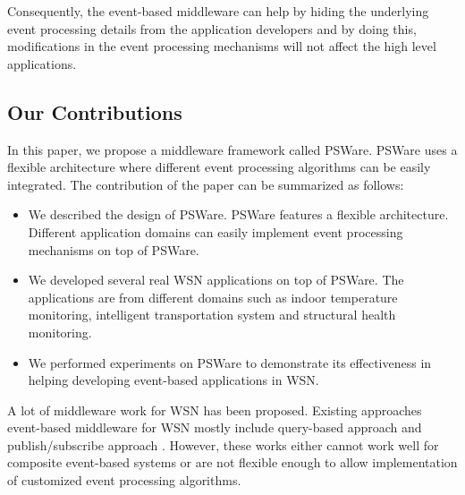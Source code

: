 Consequently, the event-based middleware can help by hiding the underlying event processing details from the application developers and by doing this, modifications in the event processing mechanisms will not affect the high level applications. 

\subsection{Our Contributions}
In this paper, we propose a middleware framework called PSWare. PSWare uses a flexible architecture where different event processing algorithms can be easily integrated. The contribution of the paper can be summarized as follows:
\begin{itemize}
\item We described the design of PSWare. PSWare features a flexible architecture. Different application domains can easily implement event processing mechanisms on top of PSWare.
\item We developed several real WSN applications on top of PSWare. The applications are from different domains such as indoor temperature monitoring, intelligent transportation system and structural health monitoring.
\item We performed experiments on PSWare to demonstrate its effectiveness in helping developing event-based applications in WSN.
\end{itemize}

A lot of middleware work for WSN has been proposed. Existing approaches event-based middleware for WSN mostly include query-based approach \cite{tinydb} and publish/subscribe approach \cite{complexevent}. However, these works either cannot work well for composite event-based systems or are not flexible enough to allow implementation of customized event processing algorithms. 



